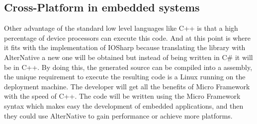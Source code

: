 \subsection{Cross-Platform in embedded systems}\label{SS:AN-Use-Cases-NETMF}
Other advantage of the standard low level languages like C++ is that a high percentage of device processors can execute this code. And at this point is where it fits with the implementation of IOSharp because translating the library with AlterNative a new one will be obtained but instead of being written in C\# it will be in C++. By doing this, the generated source can be compiled into a assembly, the unique requirement to execute the resulting code is a Linux running on the deployment machine. The developer will get all the benefits of Micro Framework with the speed of C++. The code will be written using the Micro Framework syntax which makes easy the development of embedded applications, and then they could use AlterNative to gain performance or achieve more platforms.

